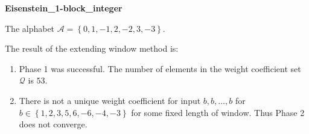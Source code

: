 \begin{exmp}
\textbf{ Eisenstein\_1-block\_integer }

\label{ex:Eisenstein1-blockinteger}

The alphabet $\mathcal{A} =\left\{0, 1, -1, 2, -2, 3, -3\right\}$.

The result of the extending window method is:
\begin{enumerate}
    \item Phase 1 was successful.
The number of elements in the weight coefficient set $\mathcal{Q}$ is $53$.

    \item There is not a unique weight coefficient for input $b,b,\dots,b$ for $b\in\left\{1, 2, 3, 5, 6, -6, -4, -3\right\}$ for some fixed length of window. Thus Phase 2 does not converge.

\end{enumerate}
\end{exmp}

